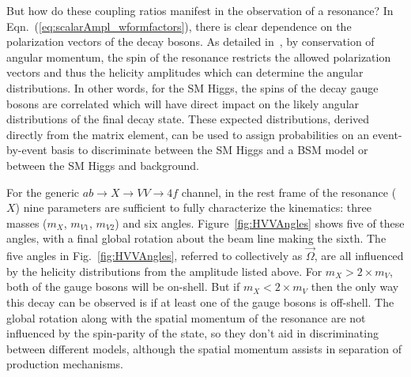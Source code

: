 But how do these coupling ratios manifest in the observation of a resonance? In Eqn.~(\ref{eq:scalarAmpl_wformfactors}), there is clear dependence on the polarization vectors of the decay bosons. As detailed in~\cite{Gao:2010qx}, by conservation of angular momentum, the spin of the resonance restricts the allowed polarization vectors and thus the helicity amplitudes which can determine the angular distributions. In other words, for the SM Higgs, the spins of the decay gauge bosons are correlated which will have direct impact on the likely angular distributions of the final decay state. These expected distributions, derived directly from the matrix element, can be used to assign probabilities on an event-by-event basis to discriminate between the SM Higgs and a BSM model or between the SM Higgs and background.

For the generic $ab \rightarrow X\rightarrow VV \rightarrow 4f$ channel, in the rest frame of the resonance ($X$) nine parameters are sufficient to fully characterize the kinematics: three masses ($m_X$, $m_{V1}$, $m_{V2}$) and six angles. Figure~\ref{fig:HVVAngles} shows five of these angles, with a final global rotation about the beam line making the sixth. The five angles in Fig.~\ref{fig:HVVAngles}, referred to collectively as $\vec{\Omega}$, are all influenced by the helicity distributions from the amplitude listed above. For $m_X > 2\times m_V$, both of the gauge bosons will be on-shell. But if $m_X < 2\times m_V$ then the only way this decay can be observed is if at least one of the gauge bosons is off-shell. The global rotation along with the spatial momentum of the resonance are not influenced by the spin-parity of the state, so they don't aid in discriminating between different models, although the spatial momentum assists in separation of production mechanisms.

